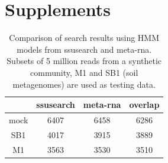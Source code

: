 \documentclass[12pt]{article}
\begin{document}



\section{Supplements}


\begin{table}[tbph!]
\caption{Comparison of search results using HMM models from ssusearch and meta-rna. Subsets of 5 million reads from a synthetic community, M1 and SB1 (soil metagenomes) are used as testing data.}
\label{tab:hmm_comparison}
\begin{tabular}{cccc}
\toprule
     & ssusearch & meta-rna & overlap \\
\midrule
mock & 6407      & 6458     & 6286 \\
SB1  & 4017      & 3915     & 3889 \\
M1   & 3563      & 3530     & 3510 \\
\bottomrule
\end{tabular}
\end{table}
\end{document}
